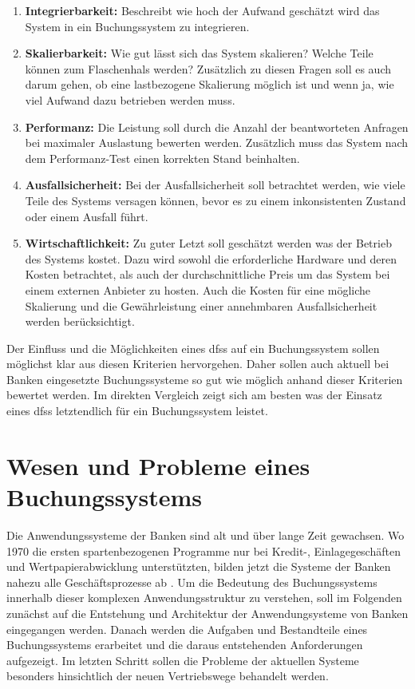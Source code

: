 \documentclass[12pt,oneside,a4paper,parskip]{scrbook}
\begin{document}
\begin{enumerate}
  \item \textbf{Integrierbarkeit:} Beschreibt wie hoch der Aufwand geschätzt wird das System in ein Buchungssystem zu integrieren.
  \item \textbf{Skalierbarkeit:} Wie gut lässt sich das System skalieren? Welche Teile können zum Flaschenhals werden? Zusätzlich zu diesen Fragen soll es auch darum gehen, ob eine lastbezogene Skalierung möglich ist und wenn ja, wie viel Aufwand dazu betrieben werden muss.
  \item \textbf{Performanz:} Die Leistung soll durch die Anzahl der beantworteten Anfragen bei maximaler Auslastung bewerten werden. Zusätzlich muss das System nach dem Performanz-Test einen korrekten Stand beinhalten.
  \item \textbf{Ausfallsicherheit:} Bei der Ausfallsicherheit soll betrachtet werden, wie viele Teile des Systems versagen können, bevor es zu einem inkonsistenten Zustand oder einem Ausfall führt.
  \item \textbf{Wirtschaftlichkeit:} Zu guter Letzt soll geschätzt werden was der Betrieb des Systems kostet. Dazu wird sowohl die erforderliche Hardware und deren Kosten betrachtet, als auch der durchschnittliche Preis um das System bei einem externen Anbieter zu hosten. Auch die Kosten für eine mögliche Skalierung und die Gewährleistung einer annehmbaren Ausfallsicherheit werden berücksichtigt.
\end{enumerate}

Der Einfluss und die Möglichkeiten eines \acp{dfs} auf ein Buchungssystem sollen möglichst klar aus diesen Kriterien hervorgehen.
Daher sollen auch aktuell bei Banken eingesetzte Buchungssysteme so gut wie möglich anhand dieser Kriterien bewertet werden. Im direkten Vergleich zeigt sich am besten was der Einsatz eines \acp{dfs} letztendlich für ein Buchungssystem leistet.

\chapter{Wesen und Probleme eines Buchungssystems}
Die Anwendungssysteme der Banken sind alt und über lange Zeit gewachsen. Wo 1970 die ersten spartenbezogenen Programme nur bei Kredit-, Einlagegeschäften und
Wertpapierabwicklung unterstützten, bilden jetzt die Systeme der Banken nahezu alle Geschäftsprozesse ab \cite[16]{ITidF}. Um die Bedeutung des Buchungssystems innerhalb dieser komplexen Anwendungsstruktur zu verstehen, soll im Folgenden zunächst auf die Entstehung und Architektur der Anwendungsysteme von Banken eingegangen werden. Danach werden die Aufgaben und Bestandteile eines Buchungssystems erarbeitet und die daraus entstehenden Anforderungen aufgezeigt. Im letzten Schritt sollen die Probleme der aktuellen Systeme besonders hinsichtlich der neuen Vertriebswege behandelt werden. 
\label{buchungssystem}
\end{document}
